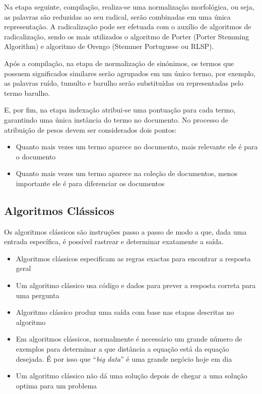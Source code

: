 \documentclass[a4paper,10pt]{article}
\begin{document}
Na etapa seguinte, compilação, realiza-se uma normalização morfológica, ou seja, as palavras são reduzidas ao seu radical, serão combinadas em uma única representação. A radicalização pode ser efetuada com o auxílio de algoritmos de radicalização, sendo os mais utilizados o algoritmo de Porter (Porter Stemming Algorithm) e algoritmo de Orengo (Stemmer Portuguese ou RLSP).

Após a compilação, na etapa de normalização de sinónimos, os termos que possuem significados similares serão agrupados em um único termo, por exemplo, as palavras ruído, tumulto e barulho serão substituídas ou representadas pelo termo barulho.

E, por fim, na etapa indexação atribui-se uma pontuação para cada termo, garantindo uma única instância do termo no documento.
No processo de atribuição de pesos devem ser considerados dois pontos:
\begin{itemize}
    \item Quanto mais vezes um termo aparece no documento, mais relevante ele é para o documento
    \item Quanto mais vezes um termo aparece na coleção de documentos, menos importante ele é para diferenciar os documentos
\end{itemize}

\subsection{Algoritmos Clássicos}

Os algoritmos clássicos são instruções passo a passo de modo a que, dada uma entrada específica, é possível rastrear e determinar exatamente a saída.
\begin{itemize}
    \item Algoritmos clássicos especificam as regras exactas para encontrar a resposta geral
    \item Um algoritmo clássico usa código e dados para prever a resposta correta para uma pergunta
    \item Algoritmo clássico produz uma saída com base nas etapas descritas no algoritmo
    \item Em algoritmos clássicos, normalmente é necessário um grande número de exemplos para determinar a que distância a equação está da equação desejada. É por isso que ``\textit{big data}'' é uma grande negócio hoje em dia
    \item Um algoritmo clássico não dá uma solução depois de chegar a uma solução optima para um problema
\end{itemize}
\end{document}
